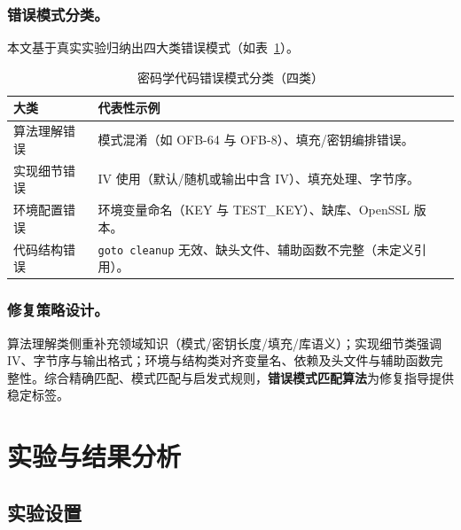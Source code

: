 \documentclass[runningheads]{llncs}
\begin{document}
\subsubsection{错误模式分类。}
本文基于真实实验归纳出四大类错误模式（如表~\ref{tab:error_classification}）。
\begin{table}[htbp]
  \centering
  \caption{密码学代码错误模式分类（四类）}
  \label{tab:error_classification}
  {\scriptsize\setlength{\tabcolsep}{6pt}
  \begin{tabular}{p{}p{}}
    \toprule
    大类 & 代表性示例 \\
    \midrule
    算法理解错误 & 模式混淆（如 OFB-64 与 OFB-8）、填充/密钥编排错误。 \\
    实现细节错误 & IV 使用（默认/随机或输出中含 IV）、填充处理、字节序。 \\
    环境配置错误 & 环境变量命名（KEY 与 TEST\_KEY）、缺库、OpenSSL 版本。 \\
    代码结构错误 & \texttt{goto cleanup} 无效、缺头文件、辅助函数不完整（未定义引用）。 \\
    \bottomrule
  \end{tabular}
  }
\end{table}

\subsubsection{修复策略设计。}
算法理解类侧重补充领域知识（模式/密钥长度/填充/库语义）；实现细节类强调 IV、字节序与输出格式；环境与结构类对齐变量名、依赖及头文件与辅助函数完整性。综合精确匹配、模式匹配与启发式规则，\textbf{错误模式匹配算法}为修复指导提供稳定标签。

\section{实验与结果分析}
\subsection{实验设置}
\end{document}
